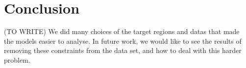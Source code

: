 \section{Conclusion}
\label{sec:conclusion}

(TO WRITE) We did many choices of the target regions and datas that made the
models easier to analyse. In future work, we would like to see the
results of removing these constraints from the data set, and how to
deal with this harder problem.
